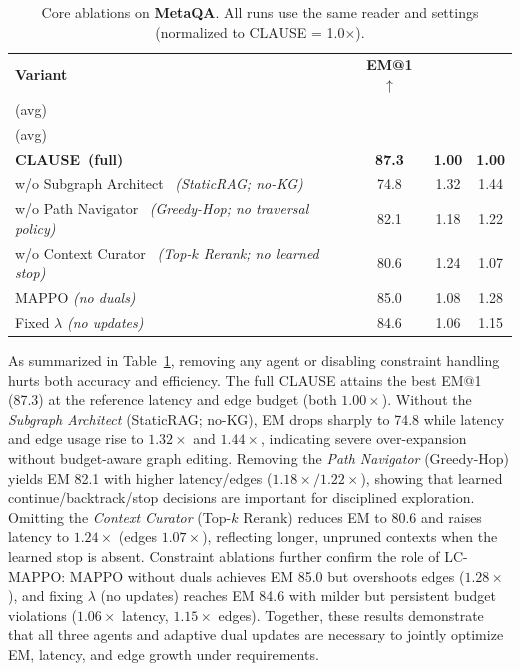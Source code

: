 \documentclass{article} %
\newcommand{\method}{\textsc{CLAUSE}\xspace}
\begin{document}
\begin{table}[htbp]
\centering
\caption{Core ablations on \textbf{MetaQA}. All runs use the same reader and settings (normalized to CLAUSE = 1.0×).}
\label{tab:core_ablations}
\setlength{\tabcolsep}{8pt}
\renewcommand{\arraystretch}{1.15}
\small
\begin{tabularx}{\linewidth}{@{}>{\raggedright\arraybackslash}X c c c@{}}
\toprule
\textbf{Variant} &
\textbf{EM@1}$\uparrow$ &
\makecell{\textbf{Latency}$\downarrow$ \\ (avg)} &
\makecell{\textbf{Edge budget}$\downarrow$ \\ (avg)} \\
\midrule
\textbf{\method\ (full)}                                                & \textbf{87.3} & \textbf{1.00} & \textbf{1.00} \\
w/o Subgraph Architect \, \textit{(StaticRAG; no-KG)}                    & 74.8 & 1.32 & 1.44 \\
w/o Path Navigator \, \textit{(Greedy-Hop; no traversal policy)}         & 82.1 & 1.18 & 1.22 \\
w/o Context Curator \, \textit{(Top-$k$ Rerank; no learned stop)}        & 80.6 & 1.24 & 1.07 \\
MAPPO \textit{(no duals)}                                                         & 85.0 & 1.08 & 1.28 \\
Fixed $\lambda$ \textit{(no updates)}                                             & 84.6 & 1.06 & 1.15 \\
\bottomrule
\end{tabularx}
\end{table}

As summarized in Table~\ref{tab:core_ablations}, removing any agent or disabling constraint handling hurts both accuracy and efficiency. The full \method{} attains the best EM@1 (87.3) at the reference latency and edge budget (both $1.00\times$). Without the \emph{Subgraph Architect} (StaticRAG; no-KG), EM drops sharply to 74.8 while latency and edge usage rise to $1.32\times$ and $1.44\times$, indicating severe over-expansion without budget-aware graph editing. Removing the \emph{Path Navigator} (Greedy-Hop) yields EM 82.1 with higher latency/edges ($1.18\times/1.22\times$), showing that learned continue/backtrack/stop decisions are important for disciplined exploration. Omitting the \emph{Context Curator} (Top-$k$ Rerank) reduces EM to 80.6 and raises latency to $1.24\times$ (edges $1.07\times$), reflecting longer, unpruned contexts when the learned stop is absent. Constraint ablations further confirm the role of LC-MAPPO: MAPPO without duals achieves EM 85.0 but overshoots edges ($1.28\times$), and fixing $\lambda$ (no updates) reaches EM 84.6 with milder but persistent budget violations ($1.06\times$ latency, $1.15\times$ edges). Together, these results demonstrate that all three agents and adaptive dual updates are necessary to jointly optimize EM, latency, and edge growth under requirements.
\end{document}
